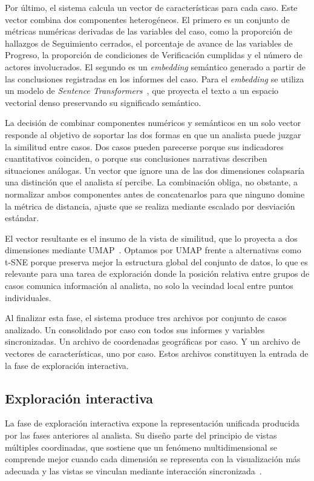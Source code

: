 Por último, el sistema calcula un vector de características 
para cada caso. Este vector combina dos componentes 
heterogéneos. El primero es un conjunto de métricas numéricas 
derivadas de las variables del caso, como la proporción de 
hallazgos de Seguimiento cerrados, el porcentaje de avance de 
las variables de Progreso, la proporción de condiciones de 
Verificación cumplidas y el número de actores involucrados. El 
segundo es un \textit{embedding} semántico generado a partir 
de las conclusiones registradas en los informes del caso. Para 
el \textit{embedding} se utiliza un modelo de \textit{Sentence 
Transformers}~\cite{reimers2019sbert}, que proyecta el texto a 
un espacio vectorial denso preservando su significado semántico.

La decisión de combinar componentes numéricos y semánticos en 
un solo vector responde al objetivo de soportar las dos 
formas en que un analista puede juzgar la similitud entre 
casos. Dos casos pueden parecerse porque sus indicadores 
cuantitativos coinciden, o porque sus conclusiones narrativas 
describen situaciones análogas. Un vector que ignore una de 
las dos dimensiones colapsaría una distinción que el analista 
sí percibe. La combinación obliga, no obstante, a normalizar 
ambos componentes antes de concatenarlos para que ninguno 
domine la métrica de distancia, ajuste que se realiza mediante 
escalado por desviación estándar.

El vector resultante es el insumo de la vista de similitud, 
que lo proyecta a dos dimensiones mediante 
\ac{UMAP}~\cite{mcinnes2018umap}. Optamos por \acs{UMAP} frente a 
alternativas como t-SNE porque preserva mejor la estructura 
global del conjunto de datos, lo que es relevante para una 
tarea de exploración donde la posición relativa entre grupos 
de casos comunica información al analista, no solo la 
vecindad local entre puntos individuales.

Al finalizar esta fase, el sistema produce tres archivos por 
conjunto de casos analizado. Un consolidado por caso con todos 
sus informes y variables sincronizadas. Un archivo de 
coordenadas geográficas por caso. Y un archivo de vectores de 
características, uno por caso. Estos archivos constituyen la 
entrada de la fase de exploración interactiva.

\subsection{Exploración interactiva}

La fase de exploración interactiva expone la representación 
unificada producida por las fases anteriores al analista. Su 
diseño parte del principio de vistas múltiples coordinadas, 
que sostiene que un fenómeno multidimensional se comprende 
mejor cuando cada dimensión se representa con la 
visualización más adecuada y las vistas se vinculan mediante 
interacción 
sincronizada~\cite{wang2000guidelines, roberts2007cmv}.

